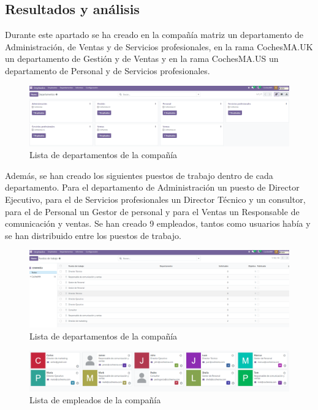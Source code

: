 \subsection{Resultados y análisis}
Durante este apartado se ha creado en la compañía matriz un departamento de Administración, de Ventas y de Servicios profesionales, en la rama CochesMA.UK un departamento de Gestión y de Ventas y en la rama CochesMA.US un departamento de Personal y de Servicios profesionales. 
\begin{figure}[h]
    \centering
    \includegraphics[width=1\linewidth]{fotosGestPers/departamentos.png}
    \caption{Lista de departamentos de la compañía}
    \label{fig:enter-label}
\end{figure}
Además, se han creado los siguientes puestos de trabajo dentro de cada departamento. Para el departamento de Administración un puesto de Director Ejecutivo, para el de Servicios profesionales un Director Técnico y un consultor, para el de Personal un Gestor de personal y para el Ventas un Responsable de comunicación y ventas. Se han creado 9 empleados, tantos como usuarios había y se han distribuido entre los puestos de trabajo. 
\begin{figure}[h]
    \centering
    \includegraphics[width=1\linewidth]{fotosGestPers/puestos.png}
    \caption{Lista de departamentos de la compañía}
    \label{fig:enter-label}
\end{figure}
\begin{figure}[h]
    \centering
    \includegraphics[width=1\linewidth]{fotosGestPers/empleados.png}
    \caption{Lista de empleados de la compañía}
    \label{fig:enter-label}
\end{figure}
